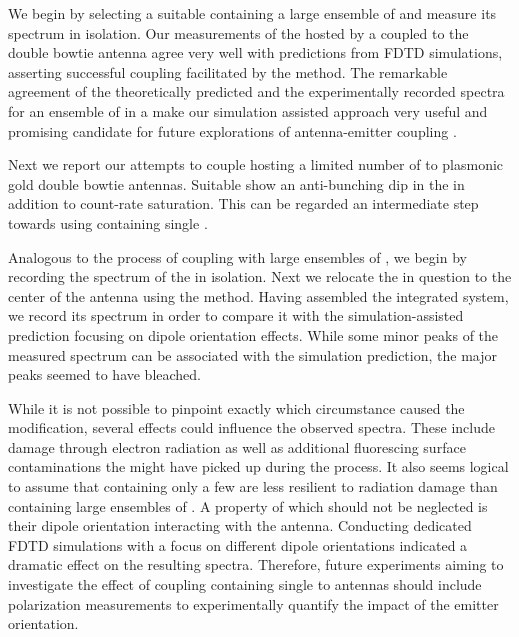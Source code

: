    We begin by selecting a suitable \nd containing a large ensemble of \sivs and measure its spectrum in isolation. Our measurements of the \siv hosted by a \nd coupled to the double bowtie antenna agree very well with predictions from FDTD simulations, asserting successful coupling facilitated by the \pp method. The remarkable agreement of the theoretically predicted and the experimentally recorded spectra for an ensemble of \sivs in a \nd make our simulation assisted approach very useful and promising candidate for future explorations of antenna-emitter coupling .


   Next we report our attempts to couple \nds hosting a limited number of \sivs to plasmonic gold double bowtie antennas. Suitable \nds show an anti-bunching dip in the \gtf in addition to count-rate saturation. This can be regarded an intermediate step towards using \nds containing single \sivs.

   Analogous to the process of coupling \nds with large ensembles of \sivs, we begin by recording the spectrum of the \nd in isolation. Next we relocate the \nd in question to the center of the antenna using the \pp method. Having assembled the integrated system, we record its spectrum in order to compare it with the simulation-assisted prediction focusing on dipole orientation effects. While some minor peaks of the measured spectrum can be associated with the simulation prediction, the major peaks seemed to have bleached.

While it is not possible to pinpoint exactly which circumstance caused the modification, several effects could influence the observed spectra. These include damage through electron radiation as well as additional fluorescing surface contaminations the \nd might have picked up during the \pp process. It also seems logical to assume that \nds containing only a few \sivs are less resilient to radiation damage than \nds containing large ensembles of \sivs.
   A property of \sivs which should not be neglected is their dipole orientation interacting with the antenna. Conducting dedicated FDTD simulations with a focus on different dipole orientations indicated a dramatic effect on the resulting spectra. Therefore, future experiments aiming to investigate the effect of coupling \nds containing single \sivs to antennas should include polarization measurements to experimentally quantify the impact of the emitter orientation. 

